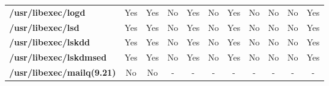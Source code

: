 \begin{center}
{\begin{tabular}{|>{\bfseries} l | C | C | C | C | C | C | C | C | C | C |}
					/usr/libexec/logd & Yes & Yes & \color{green}No & \color{red}Yes & \color{green}No & \color{red}Yes & No & No & \color{green}No & \color{red}Yes\\ 
					/usr/libexec/lsd & Yes & Yes & \color{green}No & \color{red}Yes & \color{green}No & \color{red}Yes & No & No & \color{green}No & \color{red}Yes\\ 
					/usr/libexec/lskdd & Yes & Yes & \color{green}No & \color{red}Yes & \color{green}No & \color{red}Yes & No & No & \color{green}No & \color{red}Yes\\ 
					/usr/libexec/lskdmsed & Yes & Yes & \color{green}No & \color{red}Yes & \color{green}No & \color{red}Yes & No & No & \color{green}No & \color{red}Yes\\ 
					/usr/libexec/mailq(9.21) & No & No & - & - & - & - & - & - & - & -\\ 

			\end{tabular}
		}
	\end{center}




